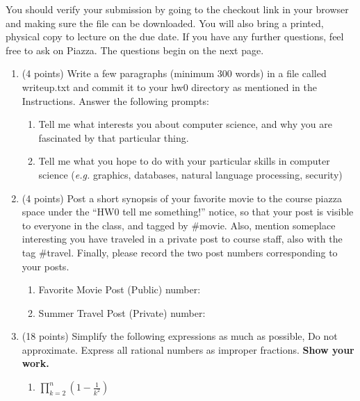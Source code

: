 \documentclass[12pt]{article}
\begin{document}
You should verify your submission by going to the checkout link in your browser
and making sure the file can be downloaded. You will also bring a printed,
physical copy to lecture on the due date. If you have any further
questions, feel free to ask on Piazza. The questions begin on the next
page.

\newpage

\begin{enumerate}

    \item (4 points) Write a few paragraphs (minimum 300 words) in a file called writeup.txt and commit
    it to your hw0 directory as mentioned in the Instructions. Answer the
    following prompts:

\begin{enumerate}
    \item Tell me what interests you about computer science, and why you are
        fascinated by that particular thing.
    \item Tell me what you hope to do with your particular skills in computer
        science (\emph{e.g.} graphics, databases, natural language processing,
        security)
\end{enumerate}

\item (4 points) Post a short synopsis of your favorite
    movie to the course piazza space under the ``HW0 tell me something!''
    notice, so that your post is visible to everyone in the class, and tagged by
    \#movie. Also, mention someplace interesting you have traveled in a
    private post to course staff, also with the tag \#travel. Finally, please
    record the two post numbers corresponding to your posts.

\begin{enumerate}
    \item Favorite Movie Post (Public) number:
    \item Summer Travel Post (Private)  number:
\end{enumerate}

\item (18 points) Simplify the following expressions as much as possible, Do not
    approximate. Express all rational numbers as improper fractions.
    \textbf{Show your work.}

\begin{enumerate}

\item $\prod_{k=2}^n (1-\frac{1}{k^2})$


\end{enumerate}
\end{enumerate}
\end{document}
